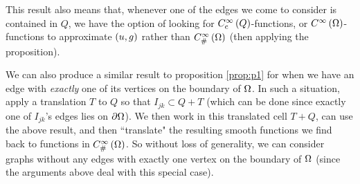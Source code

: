 \documentclass[11pt]{report}
\newcommand{\psmooth}[1]{C^{\infty}_{\#}\bracs{#1}}
\newcommand{\csmooth}[1]{C^{\infty}_{\mathrm{c}}\bracs{#1}}
\begin{document}
This result also means that, whenever one of the edges we come to consider is contained in $Q$, we have the option of looking for $\csmooth{Q}$-functions, or $C^{\infty}\left( \Omega \right)$-functions to approximate $\left( u,g \right)$ rather than $\psmooth{\ddom}$ (then applying the proposition).

We can also produce a similar result to proposition \ref{prop:p1} for when we have an edge with \emph{exactly} one of its vertices on the boundary of $\Omega$.
In such a situation, apply a translation $T$ to $Q$ so that $I_{jk}\subset Q+T$ (which can be done since exactly one of $I_{jk}$'s edges lies on $\partial\Omega$).
We then work in this translated cell $T+Q$, can use the above result, and then ``translate" the resulting smooth functions we find back to functions in $\psmooth{\ddom}$.
So without loss of generality, we can consider graphs without any edges with exactly one vertex on the boundary of $\Omega$ (since the arguments above deal with this special case).
\end{document}
